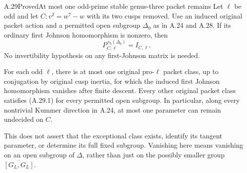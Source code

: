 \begin{statement}{A.29}{Proved}{At most one odd-prime stable genus-three packet remains}
Let $\ell$ be odd and let
$C:v^2=w^7-w$ with its two cusps removed. Use an induced
original packet action and a permitted open subgroup
$\Delta_0$ as in A.24 and A.28. If its ordinary first
Johnson homomorphism is nonzero, then
\[
                    P_{C,\ell}^{\,s_b(\Delta_0)}=I_{C,\ell}.
                                                        \tag{A.29.1}
\]
No invertibility hypothesis on any first-Johnson matrix
is needed.

For each odd $\ell$, there is at most one original
pro-$\ell$ packet class, up to conjugation by original
cusp inertia, for which the induced first Johnson
homomorphism vanishes after finite descent. Every other
original packet class satisfies (A.29.1) for every
permitted open subgroup. In particular, along every
nontrivial Kummer direction in A.24, at most one
parameter can remain undecided on $C$.

This does not assert that the exceptional class exists,
identify its tangent parameter, or determine its full
fixed subgroup. Vanishing here means vanishing on an
open subgroup of $\Delta$, rather than just on the
possibly smaller group $\overline{[G_L,G_L]}$.
\end{statement}
